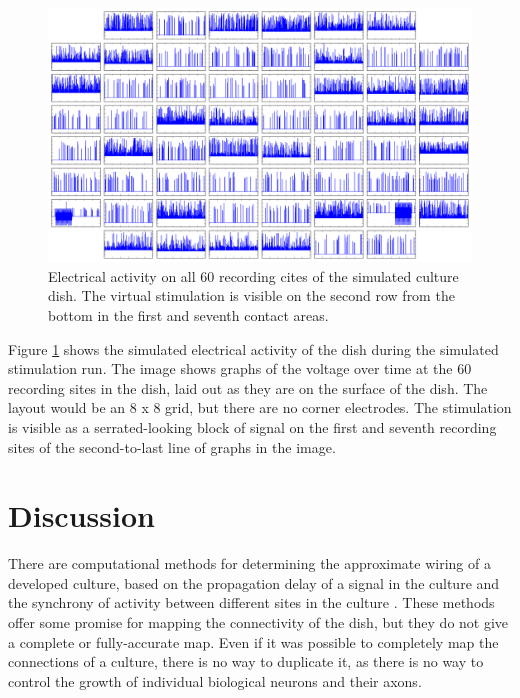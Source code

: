 \documentclass[letterpaper]{article}
\begin{document}
\begin{figure}
	\centering
	\includegraphics[width=\linewidth]{labview_2014-3-18-12:22:52_6-voltages.png}
	\caption{Electrical activity on all 60 recording cites of the simulated culture dish. The virtual stimulation is visible on the second row from the bottom in the first and seventh contact areas.}
	\label{fig:simulated_activity}
\end{figure}

Figure \ref{fig:simulated_activity} shows the simulated electrical activity of the dish during the simulated stimulation run. 
The image shows graphs of the voltage over time at the 60 recording sites in the dish, laid out as they are on the surface of the dish.
The layout would be an 8 x 8 grid, but there are no corner electrodes.
The stimulation is visible as a serrated-looking block of signal on the first and seventh recording sites of the second-to-last line of graphs in the image.

\section{Discussion}

There are computational methods for determining the approximate wiring of a developed culture, based on the propagation delay of a signal in the culture and the synchrony of activity between different sites in the culture  \cite{erickson2008caged,esposti2008estimation}. 
These methods offer some promise for mapping the connectivity of the dish, but they do not give a complete or fully-accurate map. 
Even if it was possible to completely map the connections of a culture, there is no way to duplicate it, as there is no way to control the growth of individual biological neurons and their axons. 



\end{document}
